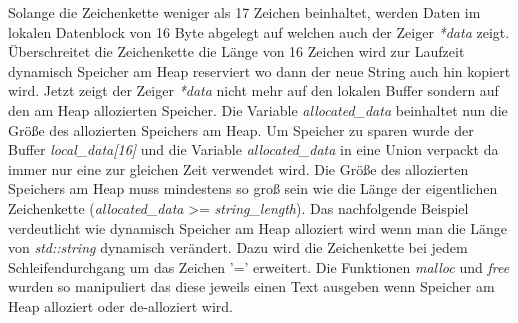 \documentclass[MES,Master,ngerman]{twbook}%
\begin{document}
\begin{figure}[!htb]
	\centering
	\begin{subfigure}[b]{0.5\textwidth}
		
		\label{lst:9}
	\end{subfigure}
\end{figure}

Solange die Zeichenkette weniger als 17 Zeichen beinhaltet, werden Daten im lokalen Datenblock von 16 Byte abgelegt auf welchen auch der Zeiger \textit{*data} zeigt. Überschreitet die Zeichenkette die Länge von 16 Zeichen wird zur Laufzeit dynamisch Speicher am Heap reserviert wo dann der neue String auch hin kopiert wird. Jetzt zeigt der Zeiger \textit{*data} nicht mehr auf den lokalen Buffer sondern auf den am Heap allozierten Speicher.
Die Variable \textit{allocated\_data} beinhaltet nun die Größe des allozierten Speichers am Heap. Um Speicher zu sparen wurde der Buffer \textit{local\_data[16]} und die Variable \textit{allocated\_data} in eine Union verpackt da immer nur eine zur gleichen Zeit verwendet wird. Die Größe des allozierten Speichers am Heap muss mindestens so groß sein wie die Länge der eigentlichen Zeichenkette (\textit{allocated\_data} >= \textit{string\_length}).\newline\newline
Das nachfolgende Beispiel verdeutlicht wie dynamisch Speicher am Heap alloziert wird wenn man die Länge von \textit{std::string} dynamisch verändert. Dazu wird die Zeichenkette bei jedem Schleifendurchgang um das Zeichen '=' erweitert. Die Funktionen \textit{malloc} und \textit{free} wurden so manipuliert das diese jeweils einen Text ausgeben wenn Speicher am Heap alloziert oder de-alloziert wird.
\end{document}
